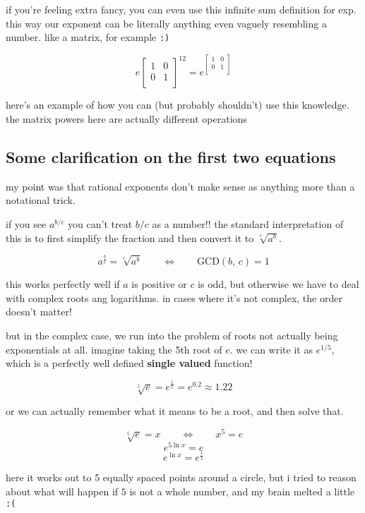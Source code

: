 \documentclass{article}
\begin{document}
  if you're feeling extra fancy, you can even use this infinite sum definition for exp. this way our exponent can be literally anything even vaguely resembling a number. like a matrix, for example \texttt{:)}

  \[
    e\begin{bmatrix}
      1&0\\
      0&1\\
    \end{bmatrix}^{12} =
    e^{\begin{bmatrix}
      1&0\\
      0&1\\
    \end{bmatrix}}
  \]

  here's an example of how you can (but probably shouldn't) use this knowledge. the matrix powers here are actually different operations

  \subsection{Some clarification on the first two equations}
  my point was that rational exponents don't make sense as anything more than a notational trick.

  if you see $a^{b/c}$ you can't treat $b/c$ as a number!!
  the standard interpretation of this is to first simplify the fraction and then convert it to $\sqrt[c]{a^b}$.

  \[
    a^\frac{b}{c} = \sqrt[c]{a^b} \qquad\iff\qquad \mathrm{GCD}(b,\, c) = 1
  \]

  this works perfectly well if $a$ is positive or $c$ is odd, but otherwise we have to deal with complex roots ang logarithms.
  in cases where it's not complex, the order doesn't matter!

  but in the complex case, we run into the problem of roots not actually being exponentials at all.
  imagine taking the 5th root of $e$.
  we can write it as $e^{1/5}$, which is a perfectly well defined \textbf{single valued} function!

  \[
    \sqrt[5]{e} = e^{\frac{1}{5}} = e^{0.2} \approx 1.22
  \]

  or we can actually remember what it means to be a root, and then solve that.

  \[ \sqrt[5]{e} = x \qquad\iff\qquad x^5 = e \]
  \[ e^{5\ln{x}} = e \]
  \[ e^{\ln{x}} = e^{\frac{1}{5}} \]

  here it works out to 5 equally spaced points around a circle, but i tried to reason about what will happen if $5$ is not a whole number, and my brain melted a little \texttt{:(}
\end{document}
